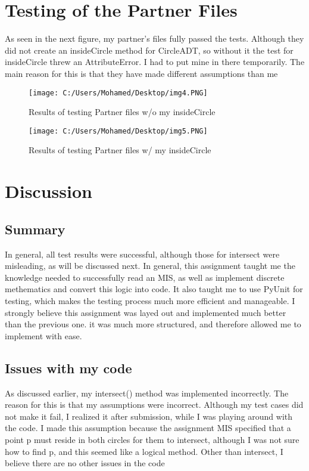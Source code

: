 \documentclass[12pt]{article}
\begin{document}
\newpage

\section*{Testing of the Partner Files}
As seen in the next figure, my partner's files fully passed the tests. Although they did not create an 
insideCircle method for CircleADT, so without it the test for insideCircle threw an AttributeError. I had to put 
mine in there temporarily. The main reason for this is that they have made different assumptions than me


\begin{figure}
\centering
\texttt{[image: C:/Users/Mohamed/Desktop/img4.PNG]}
\caption{Results of testing Partner files w/o my insideCircle}
\label{Figure : example}
\end{figure}

\begin{figure}
\centering
\texttt{[image: C:/Users/Mohamed/Desktop/img5.PNG]}
\caption{Results of testing Partner files w/ my insideCircle}
\label{Figure : example}
\end{figure}

\newpage
\section*{Discussion}
\subsection{Summary}
In general, all test results were successful, although those for intersect were misleading, as will be discussed next. In general, this assignment taught me the knowledge needed to successfully read an MIS, as well as implement discrete methematics and convert this logic into code. It also taught me to use PyUnit for testing, which makes the testing process much more efficient and manageable. I strongly believe this assignment was layed out and implemented much better than the previous one. it was much more structured, and therefore allowed me to implement with ease.
\subsection{Issues with my code}
As discussed earlier, my intersect() method was implemented incorrectly. The reason for this is that my assumptions were
incorrect. Although my test cases did not make it fail, I realized it after submission, while I was playing around with the code.
I made this assumption because the assignment MIS specified that a point p must reside in both circles for them to intersect, 
although I was not sure how to find p, and this seemed like a logical method.
Other than intersect, I believe there are no other issues in the code
 
\end{document}

